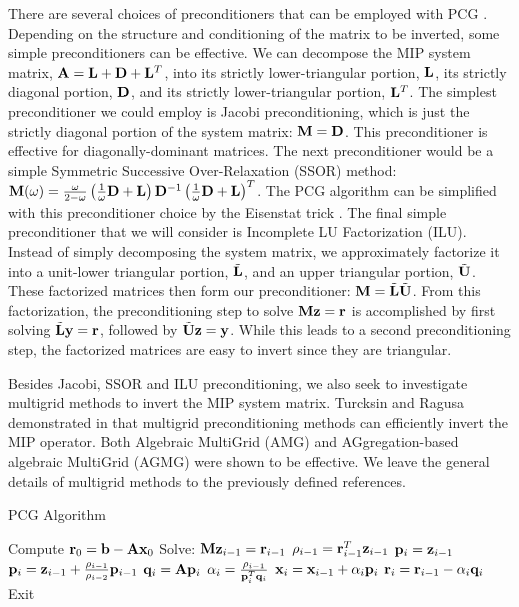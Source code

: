 There are several choices of preconditioners that can be employed with PCG \cite{saad2003iterative}. Depending on the structure and conditioning of the matrix to be inverted, some simple preconditioners can be effective. We can decompose the MIP system matrix, ${\bf A} = {\bf L} + {\bf D} + {\bf L}^T$, into its strictly lower-triangular portion, ${\bf L}$, its strictly diagonal portion, ${\bf D}$, and its strictly lower-triangular portion, ${\bf L}^T$. The simplest preconditioner we could employ is Jacobi preconditioning, which is just the strictly diagonal portion of the system matrix: ${\bf M} = {\bf D}$. This preconditioner is effective for diagonally-dominant matrices. The next preconditioner would be a simple Symmetric Successive Over-Relaxation (SSOR) method: ${\bf M} (\omega) = \frac{\omega}{2-\omega} \left( \frac{1}{\omega}{\bf D} + {\bf L}  \right)  {\bf D}^{-1}  \left( \frac{1}{\omega}{\bf D} + {\bf L}  \right)^T$. The PCG algorithm can be simplified with this preconditioner choice by the Eisenstat trick \cite{eisenstat1981efficient}. The final simple preconditioner that we will consider is Incomplete LU Factorization (ILU). Instead of simply decomposing the system matrix, we approximately factorize it into a unit-lower triangular portion, $\tilde{{\bf L}}$, and an upper triangular portion, $\tilde{{\bf U}}$. These factorized matrices then form our preconditioner: ${\bf M} =\tilde{{\bf L}}\tilde{{\bf U}}$. From this factorization, the preconditioning step to solve ${\bf M} {\bf z}= {\bf r}$ is accomplished by first solving $\tilde{{\bf L}} {\bf y}= {\bf r} $, followed by $\tilde{{\bf U}} {\bf z}= {\bf y} $. While this leads to a second preconditioning step, the factorized matrices are easy to invert since they are triangular.

Besides Jacobi, SSOR and ILU preconditioning, we also seek to investigate multigrid methods to invert the MIP system matrix. Turcksin and Ragusa demonstrated in \cite{turcksin2014discontinuous} that multigrid preconditioning methods can efficiently invert the MIP operator. Both Algebraic MultiGrid (AMG) \cite{ruge1987algebraic,briggs2000multigrid} and AGgregation-based algebraic MultiGrid (AGMG) \cite{notay2010user,notay2010aggregation,napov2012algebraic,notay2012aggregation} were shown to be effective. We leave the general details of multigrid methods to the previously defined references.

\begin{algorithm}
\caption{PCG Algorithm}
\label{alg::DSA_PCG}
\begin{algorithmic}[1]
\State Compute ${\bf r}_0 = {\bf b} - {\bf A} {\bf x}_0$
\State Solve: ${\bf M} {\bf z}_{i-1} = {\bf r}_{i-1}$
\State $\rho_{i-1} = {\bf r}_{i-1}^T {\bf z}_{i-1}$
	\State ${\bf p}_i  = {\bf z}_{i-1} $
\Else
	\State ${\bf p}_i = {\bf z}_{i-1} + \frac{\rho_{i-1}}{\rho_{i-2}}{\bf p}_{i-1}  $
\EndIf
\State ${\bf q}_i = {\bf A} {\bf p}_i$
\State $\alpha_i = \frac{\rho_{i-1}}{{\bf p}_i^T{\bf q}_i} $
\State ${\bf x}_i = {\bf x}_{i-1} + \alpha_i  {\bf p}_i$
\State ${\bf r}_i = {\bf r}_{i-1} - \alpha_i  {\bf q}_i$
	\State Exit
\EndIf
\EndFor
\end{algorithmic}
\end{algorithm}

